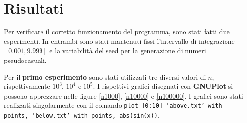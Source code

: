\documentclass[a4paper, 12pt, oneside]{article}
\begin{document}
	\section{Risultati}
	Per verificare il corretto funzionamento del programma, sono stati fatti due esperimenti. In entrambi sono stati mantenuti fissi l'intervallo di integrazione $[0.001, 9.999]$ e la variabilità del seed per la generazione di numeri pseudocasuali.
	
	Per il \textbf{primo esperimento} sono stati utilizzati tre diversi valori di $n$, rispettivamente $10^3$, $10^4$ e $10^5$. I rispettivi grafici disegnati con \textbf{GNUPlot} si possono apprezzare nelle figure \ref{n1000}, \ref{n10000} e \ref{n100000}. I grafici sono stati realizzati singolarmente con il comando \texttt{plot [0:10] 'above.txt' with points, 'below.txt' with points, abs(sin(x))}.
	
\end{document}

